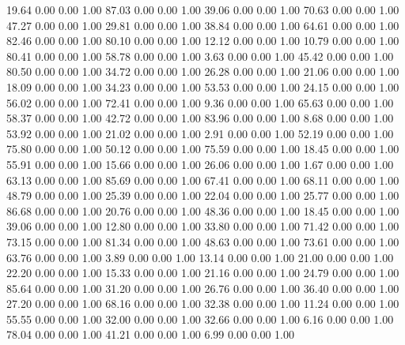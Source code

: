    19.64   0.00   0.00   1.00
   87.03   0.00   0.00   1.00
   39.06   0.00   0.00   1.00
   70.63   0.00   0.00   1.00
   47.27   0.00   0.00   1.00
   29.81   0.00   0.00   1.00
   38.84   0.00   0.00   1.00
   64.61   0.00   0.00   1.00
   82.46   0.00   0.00   1.00
   80.10   0.00   0.00   1.00
   12.12   0.00   0.00   1.00
   10.79   0.00   0.00   1.00
   80.41   0.00   0.00   1.00
   58.78   0.00   0.00   1.00
    3.63   0.00   0.00   1.00
   45.42   0.00   0.00   1.00
   80.50   0.00   0.00   1.00
   34.72   0.00   0.00   1.00
   26.28   0.00   0.00   1.00
   21.06   0.00   0.00   1.00
   18.09   0.00   0.00   1.00
   34.23   0.00   0.00   1.00
   53.53   0.00   0.00   1.00
   24.15   0.00   0.00   1.00
   56.02   0.00   0.00   1.00
   72.41   0.00   0.00   1.00
    9.36   0.00   0.00   1.00
   65.63   0.00   0.00   1.00
   58.37   0.00   0.00   1.00
   42.72   0.00   0.00   1.00
   83.96   0.00   0.00   1.00
    8.68   0.00   0.00   1.00
   53.92   0.00   0.00   1.00
   21.02   0.00   0.00   1.00
    2.91   0.00   0.00   1.00
   52.19   0.00   0.00   1.00
   75.80   0.00   0.00   1.00
   50.12   0.00   0.00   1.00
   75.59   0.00   0.00   1.00
   18.45   0.00   0.00   1.00
   55.91   0.00   0.00   1.00
   15.66   0.00   0.00   1.00
   26.06   0.00   0.00   1.00
    1.67   0.00   0.00   1.00
   63.13   0.00   0.00   1.00
   85.69   0.00   0.00   1.00
   67.41   0.00   0.00   1.00
   68.11   0.00   0.00   1.00
   48.79   0.00   0.00   1.00
   25.39   0.00   0.00   1.00
   22.04   0.00   0.00   1.00
   25.77   0.00   0.00   1.00
   86.68   0.00   0.00   1.00
   20.76   0.00   0.00   1.00
   48.36   0.00   0.00   1.00
   18.45   0.00   0.00   1.00
   39.06   0.00   0.00   1.00
   12.80   0.00   0.00   1.00
   33.80   0.00   0.00   1.00
   71.42   0.00   0.00   1.00
   73.15   0.00   0.00   1.00
   81.34   0.00   0.00   1.00
   48.63   0.00   0.00   1.00
   73.61   0.00   0.00   1.00
   63.76   0.00   0.00   1.00
    3.89   0.00   0.00   1.00
   13.14   0.00   0.00   1.00
   21.00   0.00   0.00   1.00
   22.20   0.00   0.00   1.00
   15.33   0.00   0.00   1.00
   21.16   0.00   0.00   1.00
   24.79   0.00   0.00   1.00
   85.64   0.00   0.00   1.00
   31.20   0.00   0.00   1.00
   26.76   0.00   0.00   1.00
   36.40   0.00   0.00   1.00
   27.20   0.00   0.00   1.00
   68.16   0.00   0.00   1.00
   32.38   0.00   0.00   1.00
   11.24   0.00   0.00   1.00
   55.55   0.00   0.00   1.00
   32.00   0.00   0.00   1.00
   32.66   0.00   0.00   1.00
    6.16   0.00   0.00   1.00
   78.04   0.00   0.00   1.00
   41.21   0.00   0.00   1.00
    6.99   0.00   0.00   1.00
